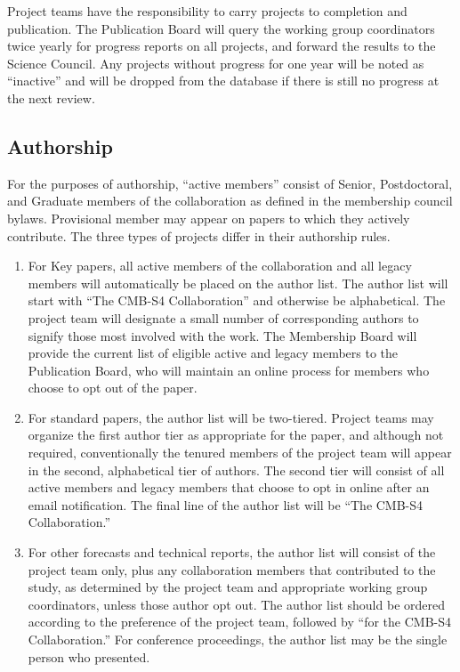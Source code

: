 Project teams have the responsibility to carry projects to completion and publication.  The Publication Board will query the working group coordinators twice yearly for progress reports on all projects, and forward the results to the Science Council.  Any projects without progress for one year will be noted as ``inactive'' and will be dropped from the database if there is still no progress at the next review.

\subsection{Authorship}

For the purposes of authorship, ``active members'' consist of Senior, Postdoctoral, and Graduate members of the collaboration as defined in the membership council bylaws.  Provisional member may appear on papers to which they actively contribute.  The three types of projects differ in their authorship rules.

\begin{enumerate}
\item For Key papers, all active members of the collaboration and all legacy members will automatically be placed on the author list.  The author list will start with ``The CMB-S4 Collaboration'' and otherwise be alphabetical.  The project team will designate a small number of corresponding authors to signify those most involved with the work.  The Membership Board will provide the current list of eligible active and legacy members to the Publication Board, who will maintain an online process for members who choose to opt out of the paper.
\item For standard papers, the author list will be two-tiered.
  Project teams may organize the first author tier as appropriate for the paper, and although not required, conventionally the tenured members of the project team will appear in the second, alphabetical tier of authors.
  The second tier will consist of all active members and legacy members that choose to opt in online after an email notification.  The final line of the author list will be ``The CMB-S4 Collaboration.''
  \item For other forecasts and technical reports, the author list will consist of the project team only, plus any collaboration members that contributed to the study, as determined by the project team and appropriate working group coordinators, unless those author opt out.  The author list should be ordered according to the preference of the project team, followed by ``for the CMB-S4 Collaboration.''  For conference proceedings, the author list may be the single person who presented.
\end{enumerate}


